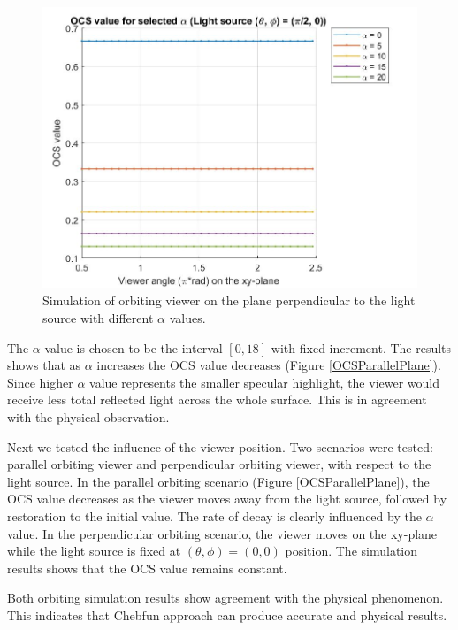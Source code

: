 \documentclass[11pt,reqno]{amsart}
\theoremstyle{definition}
\begin{document}
\begin{figure}[h]
\centering \includegraphics[scale=0.4]{./figs/OCS_perpendicular_plane}
\caption{Simulation of orbiting viewer on the plane perpendicular to the light source with different $\alpha$ values.}
\label{OCSPerpendicularPlane}
\end{figure}

The $\alpha$ value is chosen to be the interval $[0,18]$ with fixed increment. The results shows that as $\alpha$ increases the OCS value decreases (Figure \ref{OCSParallelPlane}). Since higher $\alpha$ value represents the smaller specular highlight, the viewer would receive less total reflected light across the whole surface. This is in agreement with the physical observation.

Next we tested the influence of the viewer position. Two scenarios were tested: parallel orbiting viewer and perpendicular orbiting viewer, with respect to the light source. In the parallel orbiting scenario (Figure \ref{OCSParallelPlane}), the OCS value decreases as the viewer moves away from the light source, followed by restoration to the initial value. The rate of decay is clearly influenced by the $\alpha$ value. In the perpendicular orbiting scenario, the viewer moves on the xy-plane while the light source is fixed at $(\theta, \phi) = (0,0)$ position. The simulation results shows that the OCS value remains constant.

Both orbiting simulation results show agreement with the physical phenomenon. This indicates that Chebfun approach can produce accurate and physical results.
\end{document}
